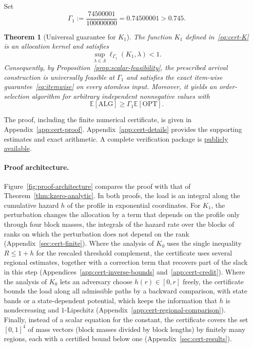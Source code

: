 \documentclass[11pt]{article}
\newtheorem{theorem}{Theorem}[section]
\theoremstyle{definition}
\theoremstyle{remark}
\newcommand{\E}{\mathbb E}
\newcommand{\ALG}{\mathrm{ALG}}
\newcommand{\OPT}{\mathrm{OPT}}
\begin{document}
Set
\begin{equation}\label{eq:cert-gamma}
 \Gamma_1:=\frac{74500001}{100000000}=0.74500001>0.745.
\end{equation}
\begin{theorem}[Universal guarantee for $K_1$]\label{thm:certified-kernel}
The function $K_1$ defined in~\eqref{eq:cert-K} is an allocation kernel
and satisfies
\begin{equation}\label{eq:cert-load-target}
 \sup_{\lambda\in\Lambda}\ell_{\Gamma_1}(K_1,\lambda)<1.
\end{equation}
Consequently, by Proposition~\ref{prop:scalar-feasibility},
the prescribed arrival construction is universally feasible at
$\Gamma_1$ and satisfies the exact item-wise
guarantee~\eqref{eq:itemwise} on every atomless input.
Moreover, it yields an order-selection algorithm for arbitrary
independent nonnegative values with
\[
 \E[\ALG]\ge\Gamma_1\E[\OPT].
\]
\end{theorem}


The proof, including the finite numerical certificate, is given in
Appendix~\ref{app:cert-proof}.
Appendix~\ref{app:cert-details} provides the supporting estimates and
exact arithmetic.
A complete verification package is
\href{https://github.com/ahqspxy/order-selection-certificate}
{publicly available}.

\paragraph{Proof architecture.}
Figure~\ref{fig:proof-architecture} compares the proof with that of
Theorem~\ref{thm:kzero-analytic}. In both proofs, the load is an integral along the
cumulative hazard $h$ of the profile in exponential coordinates. For $K_1$, the perturbation
changes the allocation by a term that depends on the profile only through four block masses,
the integrals of the hazard rate over the blocks of ranks on which the perturbation does not
depend on the rank (Appendix~\ref{sec:cert-finite}). Where the analysis of $K_0$ uses
the single inequality $R\le1+h$ for the rescaled threshold complement, the certificate uses
several regional estimates, together with a correction term that recovers part of the slack
in this step (Appendices~\ref{app:cert-inverse-bounds} and~\ref{app:cert-credit}). Where the
analysis of $K_0$ lets an adversary choose $h(r)\in[0,r]$ freely, the certificate bounds the
load along all admissible paths by a backward comparison, with state bands or a state-dependent
potential, which keeps the information that $h$ is nondecreasing and $1$-Lipschitz (Appendix~\ref{app:cert-regional-comparison}). Finally,
instead of a scalar equation for the constant, the certificate covers the set $[0,1]^4$ of
mass vectors (block masses divided by block lengths) by finitely many regions, each with a
certified bound below one
(Appendix~\ref{sec:cert-results}).
\end{document}

